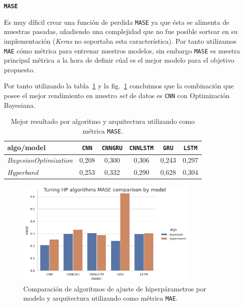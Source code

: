 \documentclass[a4paper,12pt]{article}
\begin{document}
\textbf{\texttt{MASE}}

Es muy díficil crear una función de perdida \texttt{MASE} ya que ésta se alimenta de muestras pasadas, añadiendo una complejidad que no fue posible sortear en su implementación (\textit{Keras} no soportaba esta característica). Por tanto utilizamos \texttt{MAE} cómo métrica para entrenar nuestros modelos, sin embargo \texttt{MASE} es nuestra principal métrica a la hora de definir cúal es el mejor modelo para el objetivo propuesto.

Por tanto utilizando la tabla~\ref{tab:algo_vs_arch_mase} y la fig.~\ref{fig:algo_comparison_mase} concluimos que la combinación que posee el mejor rendimiento en nuestro \textit{set} de datos es \texttt{CNN} con Optimización Bayesiana.

\begin{table}[H]
\centering
\begin{tabular}{l|ccccc}
\hline
algo/model & \texttt{CNN} & \texttt{CNNGRU} & \texttt{CNNLSTM} & \texttt{GRU} & \texttt{LSTM} \\ \hline
\textit{BayesianOptimization}         & 0,208        & 0,300           & 0,306            & 0,243        & 0,297         \\
\textit{Hyperband}         & 0,253        & 0,332           & 0,290            & 0,628        & 0,304         \\ \hline
\end{tabular}
\caption{Mejor resultado por algoritmo y arquitectura utilizando como métrica \texttt{MASE}.}
\label{tab:algo_vs_arch_mase}
\end{table}

\begin{figure}[H]
	\begin{center}
	\includegraphics[width=0.8\textwidth]{model_vs_algo_hp_mase.png}
  	\caption{Comparación de algoritmos de ajuste de hiperpárametros por modelo y arquitectura utilizando como métrica \texttt{MAE}.}
  	\label{fig:algo_comparison_mase}
  	\end{center}
\end{figure}
\end{document}
